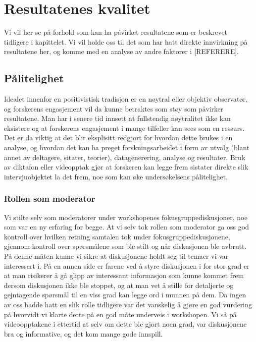 \section{Resultatenes kvalitet}
\label{chp: analyse}

Vi vil her se på forhold som kan ha påvirket resultatene som er beskrevet tidligere i kapittelet. Vi vil holde oss til det som har hatt direkte innvirkning på resultatene her, og komme med en analyse av andre faktorer i [REFERERE].

\subsection{Pålitelighet}
Idealet innenfor en positivistisk tradisjon er en nøytral eller objektiv observatør, og forskerens engasjement vil da kunne betraktes som støy som påvirker resultatene. Man har i senere tid innsett at fullstendig nøytralitet ikke kan eksistere og at forskerens engasjement i mange tilfeller kan sees som en ressurs. Det er da viktig at det blir eksplisitt redgjort for hvordan dette brukes i en analyse, og hvordan det kan ha preget forskningsarbeidet i form av utvalg (blant annet av deltagere, sitater, teorier), datagenerering, analyse og resultater. Bruk av diktafon eller videopptak gjør at forskeren kan legge frem sistater direkte slik intervjuobjektet la det frem, noe som kan øke undersøkelsens pålitelighet. 

\subsubsection{Rollen som moderator}
Vi stilte selv som moderatorer under workshopenes fokusgruppediskusjoner, noe som var en ny erfaring for begge. At vi selv tok rollen som moderator ga oss god kontroll over hvilken retning samtalen tok under fokusgruppediskusjonene, gjennom kontroll over spørsmålene som ble stilt og når diskusjonen ble avbrutt. På denne måten kunne vi sikre at diskusjonene holdt seg til temaer vi var interessert i. På en annen side er farene ved å styre diskusjonen i for stor grad er at man risikerer å gå glipp av interessant informasjon som kunne kommet frem dersom diskusjonen ikke ble stoppet, og at man vet å stille for detaljerte og gejntagende spørsmål til en viss grad kan legge ord i munnen på dem. Da ingen av oss hadde hatt en slik rolle tidligere var det vanskelig å gjøre en god vurdering på hvorvidt vi klarte dette på en god måte underveis i workshopen. Vi så på videoopptakene i ettertid at selv om dette ble gjort noen grad,  var diskusjonene bra og informative, og det kom mange gode innspill.

